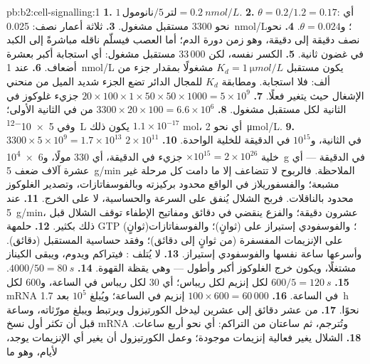 \begin{solution}{pb:b2:cell-signalling:1}
\textbf{1.} $1\,\text{نانومول}/5\,\text{لتر} = \qty{0.2}{nmol/L}$.
\textbf{2.} $\theta = 0.2/1.2 = 0.17$: أي نحو 3300 مستقبل مشغول.
\textbf{3.} ثلاثة أعمار نصف: \qty{0.025}{nmol/L}؛ و$\theta = 0.024$.
\textbf{4.} نحو نصف دقيقة إلى دقيقة، وهو زمن دورة
الدم؛ أما العصب فيسلّم ناقله مباشرةً إلى
الكبد في غضون ثانية.
\textbf{5.} الكسر نفسه، لكن $33\,000$ مستقبل مشغول: أي
استجابة أكبر بعشرة أضعاف.
\textbf{6.} عند \qty{1}{nmol/L} يكون مستقبل $K_d = \qty{1}{\micro
mol/L}$ مشغولًا بمقدار جزء من ألف: فلا استجابة. ومطابقة $K_d$
للمجال الدائر تضع الجزء شديد الميل من منحني الإشغال حيث
يتغير  فعلًا.
\textbf{7.} $20\times 100\times 1\times 50\times 50\times 1000 =
5\times 10^{9}$ جزيء غلوكوز في الثانية لكل مستقبل مشغول.
\textbf{8.} $3300\times 20\times 100 = 6.6\times 10^{6}$ من  في
الثانية الأولى؛ وفي \qty{5e-12}{L} يكون ذلك $1.1\times 10^{-17}$ mol، أي نحو
\qty{2}{\micro mol/L}.
\textbf{9.} $3300\times 5\times 10^{9} = 1.7\times 10^{13}$ في الثانية، و$10^{15}$
في الدقيقة للخلية الواحدة.
\textbf{10.} $2\times 10^{11}$ خلية $\times 10^{15} = 2\times
10^{26}$ جزيء في الدقيقة، أي 330 مولًا، و\qty{6e4}{g} في الدقيقة --- أي عشرة
آلاف ضعف \qty{5}{g/min} الملاحظة. فالربوح لا تتضاعف
إلا ما دامت كل مرحلة غير مشبعة؛ والفسفوريلاز في الواقع
محدود بركيزته وبالفوسفاتازات، وتصدير
الغلوكوز محدود بالناقلات. فربح الشلال يُنفق على السرعة
والحساسية، لا على الخرج.
\textbf{11.} عند \qty{5}{g/min}، عشرون دقيقة؛ والفزع ينقضي في
دقائق ومفاتيح الإطفاء توقف الشلال قبل ذلك بكثير.
\textbf{12.} حلمهة GTP  (ثوانٍ)؛
والفوسفودي إستيراز على  (ثوانٍ)؛ والفوسفاتازات على
الإنزيمات المفسفرة (من ثوانٍ إلى دقائق)؛ وفقد حساسية
المستقبل (دقائق). وأسرعها ساعة  نفسها
والفوسفودي إستيراز.
\textbf{13.} لا يُتلف : فيتراكم ويدوم، ويبقى
الكيناز مشتغلًا، ويكون خرج الغلوكوز أكبر وأطول
--- وهي يقظة القهوة.
\textbf{14.} $4000/50 = \qty{80}{s}$.
\textbf{15.} $600/5 = \qty{120}{s}$ لكل إنزيم لكل ريباس؛ أي 30 لكل
ريباس في الساعة، و600 لكل mRNA في الساعة.
\textbf{16.} $100\times 600 = 60\,000$ إنزيم في الساعة؛ ويُبلغ $10^{5}$ بعد
\qty{1.7}{h} نحوًا.
\textbf{17.} من عشر دقائق إلى عشرين ليدخل الكورتيزول ويرتبط
ويبلغ مورّثاته، وساعة قبل أن تكثر أول نسخ mRNA وتُترجم،
ثم ساعتان من التراكم: أي نحو أربع ساعات.
\textbf{18.} الشلال يغير فعالية إنزيمات موجودة؛
وعمل الكورتيزول أن يغير أي الإنزيمات يوجد، لأيام، وهو ما

\end{solution}
